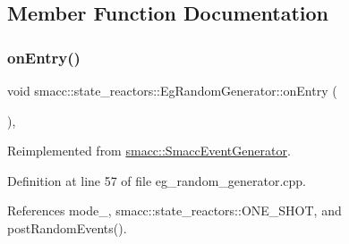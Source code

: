 \subsection{Member Function Documentation}
\mbox{\label{classsmacc_1_1state__reactors_1_1EgRandomGenerator_aec89532c1b53e42e5d9006eddfea10e6}} 
\subsubsection{\texorpdfstring{on\+Entry()}{onEntry()}}
{\footnotesize\ttfamily void smacc\+::state\+\_\+reactors\+::\+Eg\+Random\+Generator\+::on\+Entry (\begin{DoxyParamCaption}{ }\end{DoxyParamCaption})\hspace{0.3cm}{\ttfamily [override]}, {\ttfamily [virtual]}}



Reimplemented from \hyperlink{classsmacc_1_1SmaccEventGenerator_aa1eb9cc0fd1b3e83cc87d4871fb0f68a}{smacc\+::\+Smacc\+Event\+Generator}.



Definition at line 57 of file eg\+\_\+random\+\_\+generator.\+cpp.



References mode\+\_\+, smacc\+::state\+\_\+reactors\+::\+O\+N\+E\+\_\+\+S\+H\+OT, and post\+Random\+Events().


